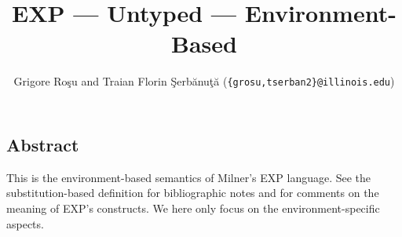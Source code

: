 \setlength{\parindent}{1em}
\title{EXP --- Untyped --- Environment-Based}
\author{Grigore Ro\c{s}u and
        Traian Florin \c{S}erb\u{a}nu\c{t}\u{a}
	(\texttt{\{grosu,tserban2\}@illinois.edu})}

\maketitle

\begin{latexComment}
\section{Abstract}
This is the environment-based \K semantics of Milner's EXP
language.  See the substitution-based definition for bibliographic
notes and for comments on the meaning of EXP's constructs.  We here
only focus on the environment-specific aspects.
\end{latexComment}

\vspace*{3ex}
